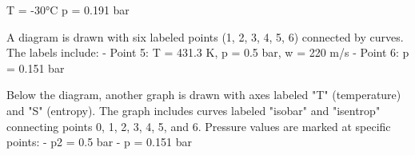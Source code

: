 T = -30°C  
p = 0.191 bar  

A diagram is drawn with six labeled points (1, 2, 3, 4, 5, 6) connected by curves. The labels include:  
- Point 5: T = 431.3 K, p = 0.5 bar, w = 220 m/s  
- Point 6: p = 0.151 bar  

Below the diagram, another graph is drawn with axes labeled "T" (temperature) and "S" (entropy). The graph includes curves labeled "isobar" and "isentrop" connecting points 0, 1, 2, 3, 4, 5, and 6. Pressure values are marked at specific points:  
- p2 = 0.5 bar  
- p = 0.151 bar
